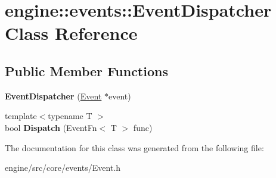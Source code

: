 \hypertarget{classengine_1_1events_1_1EventDispatcher}{}\section{engine\+:\+:events\+:\+:Event\+Dispatcher Class Reference}
\label{classengine_1_1events_1_1EventDispatcher}
\subsection*{Public Member Functions}
\begin{DoxyCompactItemize}
\item
\mbox{\label{classengine_1_1events_1_1EventDispatcher_a1a599ea2862fbf8ccff7510b3d1356f0}}
{\bfseries Event\+Dispatcher} (\hyperlink{classengine_1_1events_1_1Event}{Event} $\ast$event)
\item
\mbox{\label{classengine_1_1events_1_1EventDispatcher_a33900734f1a360056938b1e4566de002}}
{\footnotesize template$<$typename T $>$ }\\bool {\bfseries Dispatch} (Event\+Fn$<$ T $>$ func)
\end{DoxyCompactItemize}


The documentation for this class was generated from the following file\+:\begin{DoxyCompactItemize}
\item
engine/src/core/events/Event.\+h\end{DoxyCompactItemize}
